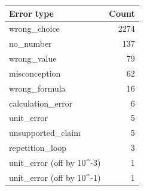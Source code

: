 \begin{tabular}{lr}
\toprule
Error type & Count \\
\midrule
wrong\_choice & 2274 \\
no\_number & 137 \\
wrong\_value & 79 \\
misconception & 62 \\
wrong\_formula & 16 \\
calculation\_error & 6 \\
unit\_error & 5 \\
unsupported\_claim & 5 \\
repetition\_loop & 3 \\
unit\_error (off by 10\textasciicircum{}-3) & 1 \\
unit\_error (off by 10\textasciicircum{}-1) & 1 \\
\bottomrule
\end{tabular}
